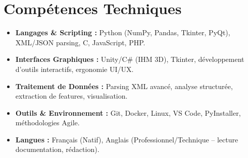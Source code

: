\documentclass[a4paper,11pt]{article}
\begin{document}
\section{Compétences Techniques}
\begin{itemize}[leftmargin=*, nosep]
    \item \small{\textbf{Langages \& Scripting :} Python (NumPy, Pandas, Tkinter, PyQt), XML/JSON parsing, C, JavaScript, PHP.}
    \item \small{\textbf{Interfaces Graphiques :} Unity/C\# (IHM 3D), Tkinter, développement d'outils interactifs, ergonomie UI/UX.}
    \item \small{\textbf{Traitement de Données :} Parsing XML avancé, analyse structurée, extraction de features, visualisation.}
    \item \small{\textbf{Outils \& Environnement :} Git, Docker, Linux, VS Code, PyInstaller, méthodologies Agile.}
    \item \small{\textbf{Langues :} Français (Natif), Anglais (Professionnel/Technique -- lecture documentation, rédaction).}
\end{itemize}

\end{document}
